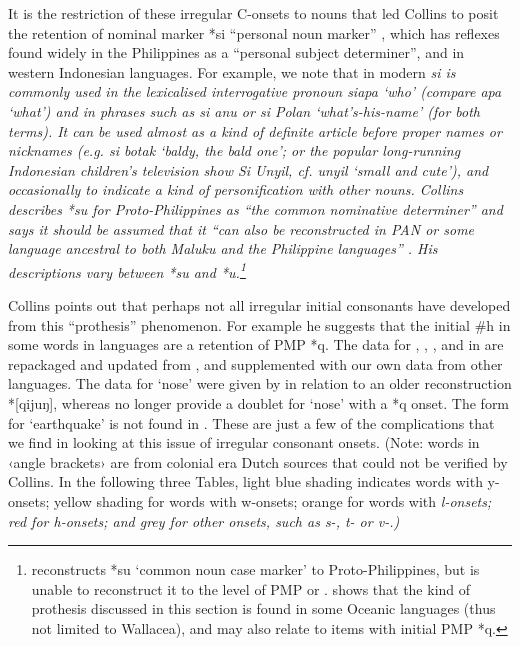 It is the restriction of these irregular C-onsets to nouns that
led Collins to posit the retention of  nominal marker
*si “personal noun marker” \citep[124]{Collins1983},
which has reflexes found widely in the Philippines as a “personal
subject determiner”, and in western Indonesian languages.
For example, we note that in modern  \it{si} is commonly
used in the lexicalised interrogative pronoun \it{siapa} ‘who’
(compare \it{apa} ‘what’) and in phrases such as \it{si anu}
or \it{si Polan} ‘what’s-his-name’ (for both terms).
It can be used almost as a kind of definite article before proper
names or nicknames (e.g.
\it{si botak} ‘baldy, the bald one’; or the popular long-running
Indonesian children’s television show \it{Si Unyil}, cf.
\it{unyil} ‘small and cute’), and occasionally to indicate a
kind of personification with other nouns.
Collins describes *su for Proto-Philippines as “the common nominative
determiner” and says it should be assumed that it “can also be reconstructed
in PAN or some language ancestral to both  Maluku
and the Philippine languages” \citep[126]{Collins1983}.
His descriptions vary between *su
and *u.\footnote{
		\citet{Blust2015} reconstructs *su ‘common noun
		case marker’ to Proto-Philippines,
		but is unable to reconstruct it to the level of PMP or .
		\citet{Lichtenberk1988} shows that the kind of prothesis discussed
		in this section is found in some Oceanic languages (thus not
		limited to Wallacea), and may also relate to items with initial PMP *q.}

Collins points out that perhaps not all irregular initial consonants
have developed from this “prothesis” phenomenon.
For example he suggests that the initial {\#}h in some words
in  languages are a retention of PMP *q.
The data for ,
, , and  in  are repackaged
and updated from \citet[121]{Collins1983},
and supplemented with our own data from other languages.
The data for ‘nose’ were given by \citet[121]{Collins1983} in
relation to an older reconstruction *[qijuŋ],
whereas \citet{BlustTrussel2020} no longer provide a doublet
for ‘nose’ with a *q onset.
The form for ‘earthquake’ is not found in \citet{BlustTrussel2020}.
These are just a few of the complications that we find in looking
at this issue of irregular consonant onsets.
(Note: words in ‹angle brackets› are from colonial era Dutch
sources that could not be verified by Collins.
In the following three Tables,
light blue shading indicates words with y-onsets; yellow shading
for words with w-onsets; orange for words with \it{l}-onsets;
red for \it{h}-onsets; and grey for other onsets,
such as \it{s-, t-} or \it{v-}.)

